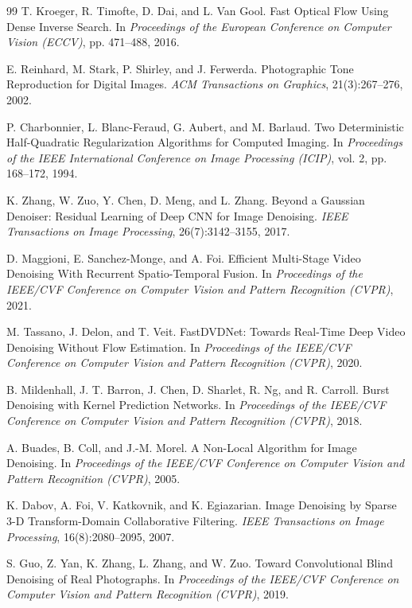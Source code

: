 \documentclass[11pt,a4paper,UTF8,fontset=fandol]{ctexart}
\begin{document}
\begin{thebibliography}{99}
 T. Kroeger, R. Timofte, D. Dai, and L. Van Gool. Fast Optical Flow Using Dense Inverse Search. In \emph{Proceedings of the European Conference on Computer Vision (ECCV)}, pp. 471--488, 2016.

 E. Reinhard, M. Stark, P. Shirley, and J. Ferwerda. Photographic Tone Reproduction for Digital Images. \emph{ACM Transactions on Graphics}, 21(3):267--276, 2002.

 P. Charbonnier, L. Blanc-Feraud, G. Aubert, and M. Barlaud. Two Deterministic Half-Quadratic Regularization Algorithms for Computed Imaging. In \emph{Proceedings of the IEEE International Conference on Image Processing (ICIP)}, vol. 2, pp. 168--172, 1994.

 K. Zhang, W. Zuo, Y. Chen, D. Meng, and L. Zhang. Beyond a Gaussian Denoiser: Residual Learning of Deep CNN for Image Denoising. \emph{IEEE Transactions on Image Processing}, 26(7):3142--3155, 2017.

 D. Maggioni, E. Sanchez-Monge, and A. Foi. Efficient Multi-Stage Video Denoising With Recurrent Spatio-Temporal Fusion. In \emph{Proceedings of the IEEE/CVF Conference on Computer Vision and Pattern Recognition (CVPR)}, 2021.

 M. Tassano, J. Delon, and T. Veit. FastDVDNet: Towards Real-Time Deep Video Denoising Without Flow Estimation. In \emph{Proceedings of the IEEE/CVF Conference on Computer Vision and Pattern Recognition (CVPR)}, 2020.

 B. Mildenhall, J. T. Barron, J. Chen, D. Sharlet, R. Ng, and R. Carroll. Burst Denoising with Kernel Prediction Networks. In \emph{Proceedings of the IEEE/CVF Conference on Computer Vision and Pattern Recognition (CVPR)}, 2018.

 A. Buades, B. Coll, and J.-M. Morel. A Non-Local Algorithm for Image Denoising. In \emph{Proceedings of the IEEE/CVF Conference on Computer Vision and Pattern Recognition (CVPR)}, 2005.

 K. Dabov, A. Foi, V. Katkovnik, and K. Egiazarian. Image Denoising by Sparse 3-D Transform-Domain Collaborative Filtering. \emph{IEEE Transactions on Image Processing}, 16(8):2080--2095, 2007.

 S. Guo, Z. Yan, K. Zhang, L. Zhang, and W. Zuo. Toward Convolutional Blind Denoising of Real Photographs. In \emph{Proceedings of the IEEE/CVF Conference on Computer Vision and Pattern Recognition (CVPR)}, 2019.

\end{thebibliography}
\end{document}
